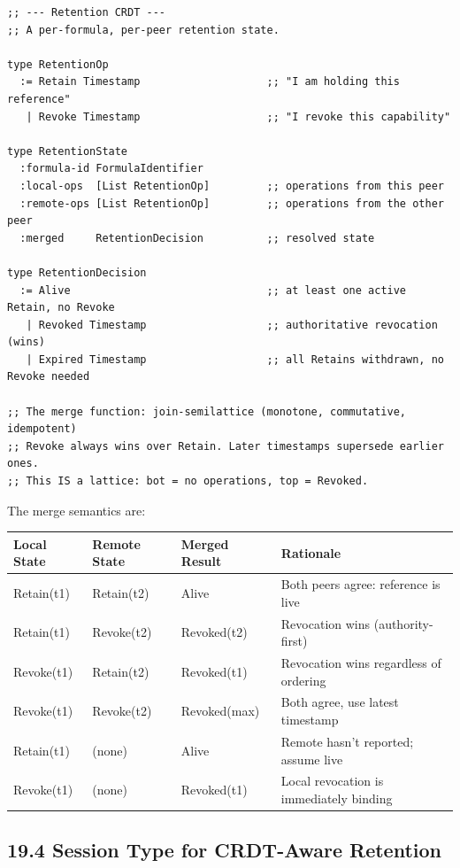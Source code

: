 \documentclass[11pt]{article}
\begin{document}
\begin{verbatim}
;; --- Retention CRDT ---
;; A per-formula, per-peer retention state.

type RetentionOp
  := Retain Timestamp                    ;; "I am holding this reference"
   | Revoke Timestamp                    ;; "I revoke this capability"

type RetentionState
  :formula-id FormulaIdentifier
  :local-ops  [List RetentionOp]         ;; operations from this peer
  :remote-ops [List RetentionOp]         ;; operations from the other peer
  :merged     RetentionDecision          ;; resolved state

type RetentionDecision
  := Alive                               ;; at least one active Retain, no Revoke
   | Revoked Timestamp                   ;; authoritative revocation (wins)
   | Expired Timestamp                   ;; all Retains withdrawn, no Revoke needed

;; The merge function: join-semilattice (monotone, commutative, idempotent)
;; Revoke always wins over Retain. Later timestamps supersede earlier ones.
;; This IS a lattice: bot = no operations, top = Revoked.
\end{verbatim}

The merge semantics are:

\begin{center}
\begin{tabular}{llll}
Local State & Remote State & Merged Result & Rationale\\
\hline
Retain(t1) & Retain(t2) & Alive & Both peers agree: reference is live\\
Retain(t1) & Revoke(t2) & Revoked(t2) & Revocation wins (authority-first)\\
Revoke(t1) & Retain(t2) & Revoked(t1) & Revocation wins regardless of ordering\\
Revoke(t1) & Revoke(t2) & Revoked(max) & Both agree, use latest timestamp\\
Retain(t1) & (none) & Alive & Remote hasn't reported; assume live\\
Revoke(t1) & (none) & Revoked(t1) & Local revocation is immediately binding\\
\end{tabular}
\end{center}
\subsection{19.4 Session Type for CRDT-Aware Retention}
\label{sec:org59e9a4d}
\end{document}
